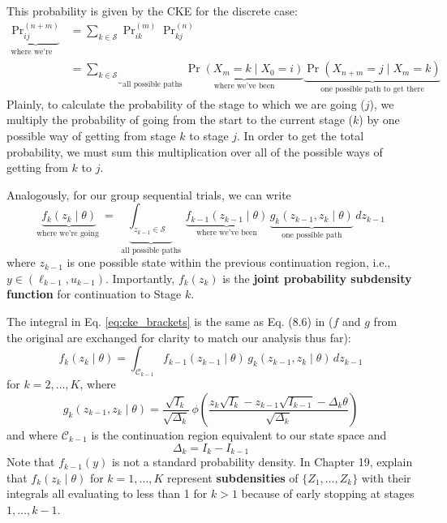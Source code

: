 \documentclass{article}
\begin{document}
This probability is given by the CKE for the discrete case:
%
\begin{align}
    \underbrace{\Pr\nolimits_{ij}^{(n+m)}}_{\text{where we're going}} &= \sum_{k\in\mathcal{S}} \Pr\nolimits_{ik}^{(m)} \Pr\nolimits_{kj}^{(n)}\\
    &=\underbrace{\sum_{k\in\mathcal{S}}}_{\text{all possible paths}} \underbrace{ \Pr(X_m=k\mid X_0=i) }_{\text{where we've been}} \underbrace{\Pr(X_{n+m} = j \mid X_m=k)}_{\text{one possible path to get there}}
\end{align}
%
Plainly, to calculate the probability of the stage to which we are going ($j$), we multiply the probability of going from the start to the current stage ($k$) by one possible way of getting from stage $k$ to stage $j$. In order to get the total probability, we must sum this multiplication over all of the possible ways of getting from $k$ to $j$.

Analogously, for our group sequential trials, we can write
%
\begin{equation} \label{eq:cke_brackets}
    \underbrace{f_k(z_k\mid\theta)}_{\text{where we're going }} = \underbrace{\int_{z_{k-1}\in\mathcal{S}}}_{\text{ all possible paths }} \underbrace{f_{k-1}(z_{k-1}\mid\theta)}_{\text{ where we've been }}\,\underbrace{g_k(z_{k-1},z_k\mid \theta)}_{\text{ one possible path }}\,dz_{k-1}
\end{equation}
%
where $z_{k-1}$ is one possible state within the previous continuation region, i.e., $y\in(\ell_{k-1},u_{k-1})$. Importantly, $f_k(z_k)$ is the \textbf{joint probability subdensity function} for continuation to Stage $k$.

The integral in Eq. \eqref{eq:cke_brackets} is the same as Eq. (8.6) in \textcite{jennison1999group} ($f$ and $g$ from the original are exchanged for clarity to match our analysis thus far):
\begin{equation} \label{eq:cke_jennison}
    f_k(z_k\mid\theta)=\int_{\mathcal{C}_{k-1}} f_{k-1}(z_{k-1}\mid\theta)\,g_k(z_{k-1},z_k\mid\theta)\,dz_{k-1}
\end{equation}
%
for $k=2,\dots,K$, where 
\begin{equation} \label{eq:jennison_g}
    g_k(z_{k-1},z_k\mid\theta)=\frac{\sqrt{I_k}}{\sqrt{\Delta_k}}\,\phi\left(\frac{z_k\sqrt{I_k}-z_{k-1}\sqrt{I_{k-1}}-\Delta_k\theta}{\sqrt{\Delta_k}}\right)
\end{equation}
%
and where $\mathcal{C}_{k-1}$ is the continuation region equivalent to our state space and 
%
\begin{equation} \label{eq:delta_k}
    \Delta_k=I_k-I_{k-1}
\end{equation}
%
Note that $f_{k-1}(y)$ is not a standard probability density. In Chapter 19, \textcite{jennison1999group} explain that $f_k(z_k\mid\theta)$ for $k=1,\dots,K$ represent \textbf{subdensities} of $\{Z_1,\dots,Z_k\}$ with their integrals all evaluating to less than 1 for $k>1$ because of early stopping at stages $1,\dots,k-1$.
\end{document}
